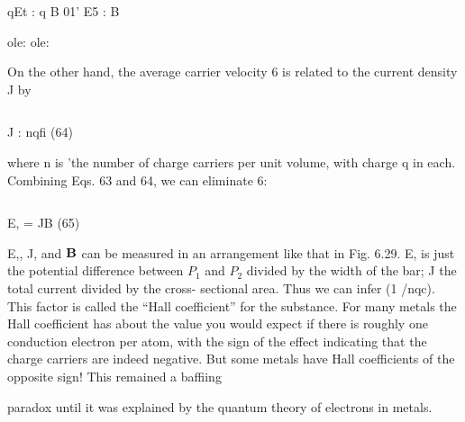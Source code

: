 \begin{equation}
\end{equation}

qEt : q B 01' E5 : B 

ole:
ole:

On the other hand, the average carrier velocity 6 is related to the
current density J by

\begin{equation}
\end{equation}

J : nqfi (64)

where n is 'the number of charge carriers per unit volume, with charge
q in each. Combining Eqs. 63 and 64, we can eliminate 6:

\begin{equation}
\end{equation}

E, = JB (65)

E,, J, and $\mathbf{B}$ can be measured in an arrangement like that in
Fig. 6.29. E, is just the potential difference between $P_1$ and $P_2$ divided
by the width of the bar; J the total current divided by the cross-
sectional area. Thus we can infer (1 /nqc). This factor is called the
``Hall coefficient'' for the substance. For many metals the Hall
coefficient has about the value you would expect if there is roughly
one conduction electron per atom, with the sign of the effect indicating
that the charge carriers are indeed negative. But some metals
have Hall coefficients of the opposite sign! This remained a baffiing

paradox until it was explained by the quantum theory of electrons
in metals.

\fi
